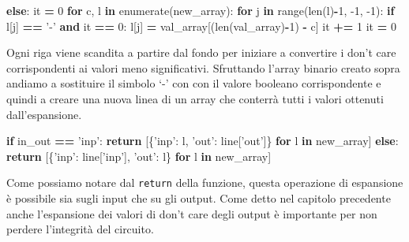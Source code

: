 \documentclass[italian,]{book}
\newenvironment{Shaded}{\begin{snugshade}}{\end{snugshade}}
\newcommand{\BuiltInTok}[1]{#1}
\newcommand{\ControlFlowTok}[1]{\textcolor[rgb]{0.13,0.29,0.53}{\textbf{#1}}}
\newcommand{\DecValTok}[1]{\textcolor[rgb]{0.00,0.00,0.81}{#1}}
\newcommand{\KeywordTok}[1]{\textcolor[rgb]{0.13,0.29,0.53}{\textbf{#1}}}
\newcommand{\NormalTok}[1]{#1}
\newcommand{\OperatorTok}[1]{\textcolor[rgb]{0.81,0.36,0.00}{\textbf{#1}}}
\newcommand{\StringTok}[1]{\textcolor[rgb]{0.31,0.60,0.02}{#1}}
\begin{document}
\begin{Shaded}
\begin{Highlighting}[]
\ControlFlowTok{else}\NormalTok{:}
\NormalTok{  it }\OperatorTok{=} \DecValTok{0}
  \ControlFlowTok{for}\NormalTok{ c, l }\KeywordTok{in} \BuiltInTok{enumerate}\NormalTok{(new_array):}
    \ControlFlowTok{for}\NormalTok{ j }\KeywordTok{in} \BuiltInTok{range}\NormalTok{(}\BuiltInTok{len}\NormalTok{(l)}\OperatorTok{-}\DecValTok{1}\NormalTok{, }\DecValTok{-1}\NormalTok{, }\DecValTok{-1}\NormalTok{):}
      \ControlFlowTok{if}\NormalTok{ l[j] }\OperatorTok{==} \StringTok{'-'} \KeywordTok{and}\NormalTok{ it }\OperatorTok{==} \DecValTok{0}\NormalTok{:}
\NormalTok{        l[j] }\OperatorTok{=}\NormalTok{ val_array[(}\BuiltInTok{len}\NormalTok{(val_array)}\OperatorTok{-}\DecValTok{1}\NormalTok{) }\OperatorTok{-}\NormalTok{ c]}
\NormalTok{        it }\OperatorTok{+=} \DecValTok{1}
\NormalTok{    it }\OperatorTok{=} \DecValTok{0}
\end{Highlighting}
\end{Shaded}

Ogni riga viene scandita a partire dal fondo per iniziare a convertire i don't care corrispondenti ai valori meno significativi. Sfruttando l'array binario creato sopra andiamo a sostituire il simbolo `-' con con il valore booleano corrispondente e quindi a creare una nuova linea di un array che conterrà tutti i valori ottenuti dall'espansione.

\newpage

\begin{Shaded}
\begin{Highlighting}[]
\ControlFlowTok{if}\NormalTok{ in_out }\OperatorTok{==} \StringTok{'inp'}\NormalTok{:}
  \ControlFlowTok{return}\NormalTok{ [\{}\StringTok{'inp'}\NormalTok{:  l, }\StringTok{'out'}\NormalTok{:  line[}\StringTok{'out'}\NormalTok{]\} }\ControlFlowTok{for}\NormalTok{ l }\KeywordTok{in}\NormalTok{ new_array]}
\ControlFlowTok{else}\NormalTok{:}
  \ControlFlowTok{return}\NormalTok{ [\{}\StringTok{'inp'}\NormalTok{:  line[}\StringTok{'inp'}\NormalTok{], }\StringTok{'out'}\NormalTok{:  l\} }\ControlFlowTok{for}\NormalTok{ l }\KeywordTok{in}\NormalTok{ new_array]}
\end{Highlighting}
\end{Shaded}

Come possiamo notare dal \texttt{return} della funzione, questa operazione di espansione è possibile sia sugli input che su gli output. Come detto nel capitolo precedente anche l'espansione dei valori di don't care degli output è importante per non perdere l'integrità del circuito.
\end{document}
